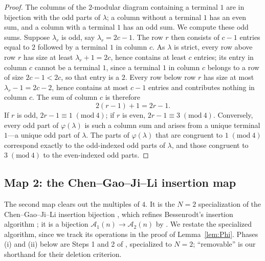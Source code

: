 \documentclass[11pt]{amsart}
\theoremstyle{definition}
\theoremstyle{remark}
\newcommand{\Aone}{\mathcal A_1}
\newcommand{\Atwo}{\mathcal A_2}
\newcommand{\modulo}[1]{\;(\mathrm{mod}\ #1)}
\begin{document}
\begin{proof}
The columns of the \(2\)-modular diagram containing a terminal \(1\) are in
bijection with the odd parts of \(\lambda\); a column without a terminal \(1\) has an even sum, and a column with a terminal \(1\) has an odd sum. We compute these odd
sums. Suppose \(\lambda_r\) is odd, say \(\lambda_r=2c-1\). The row $r$ then consists of \(c-1\) entries equal to \(2\) followed by a terminal \(1\) in column \(c\). As \(\lambda\) is strict, every row above row \(r\) has size at least \(\lambda_r+1=2c\), hence contains at least \(c\) entries; its entry in column $c$ cannot be a terminal $1$, since a terminal $1$ in column $c$ belongs to a row of size $2c-1<2c$, so that entry is a $2$. Every row below row \(r\) has size at most \(\lambda_r-1=2c-2\), hence contains at most \(c-1\) entries and contributes nothing in column \(c\).
The sum of column \(c\) is therefore
\[
   2(r-1)+1=2r-1.
\]
If \(r\) is odd, \(2r-1\equiv 1\modulo 4\); if \(r\) is even,
\(2r-1\equiv 3\modulo 4\). Conversely, every odd part of \(\varphi(\lambda)\) is such a column sum and arises from a unique terminal \(1\)---a unique odd part of \(\lambda\). The parts of \(\varphi(\lambda)\) that are
congruent to \(1\modulo 4\) correspond exactly to the odd-indexed odd parts of
\(\lambda\), and those congruent to \(3\modulo 4\) to the even-indexed odd parts.
\end{proof}

\subsection{Map 2: the Chen--Gao--Ji--Li insertion map}\label{sec:map2}
The second map clears out the multiples of $4$. It is the \(N=2\) specialization of the Chen--Gao--Ji--Li insertion bijection \cite[Theorem 2.4 and Section 3]{CGJL}, which refines Bessenrodt's insertion algorithm \cite{Bess1991,Bess1995}; it is a bijection \(\Aone(n)\to\Atwo(n)\) by \cite[Section 3]{CGJL}. We restate the specialized algorithm, since we track its operations in the proof of Lemma~\ref{lem:Phi}. Phases (i) and (ii) below are Steps 1 and 2 of \cite[Section 3]{CGJL}, specialized to $N=2$; ``removable'' is our shorthand for their deletion criterion.
\end{document}
